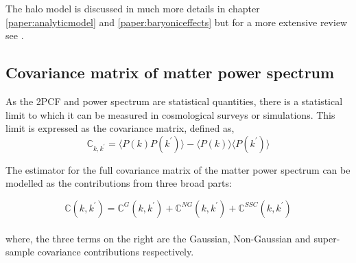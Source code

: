 The halo model is discussed in much more details in chapter \ref{paper:analyticmodel} 
and \ref{paper:baryoniceffects} but for a more extensive review see
\cite{2002PhR...372....1C}.


\subsection{Covariance matrix of matter power spectrum}
As the 2PCF and power spectrum are statistical quantities, there is a statistical limit
to which it can be measured in cosmological surveys or simulations. This limit is expressed
as the covariance matrix, defined as,
\begin{equation}
	\mathbb{C}_{k,k^{\prime}}	= 
			\langle P(k)P(k^{\prime}) \rangle - 
			\langle P(k)\rangle \langle P(k^{\prime})\rangle
\end{equation}

The estimator for the full covariance matrix of the matter power spectrum 
can be modelled as the contributions from three broad parts:

\begin{equation}
	\mathbb{C}(k,k^{\prime}) = \mathbb{C}^{G}(k,k^{\prime}) + 
								\mathbb{C}^{NG}(k,k^{\prime}) + 
								\mathbb{C}^{SSC}(k,k^{\prime})
\end{equation}
\\
where, the three terms on the right are the Gaussian, Non-Gaussian and 
super-sample covariance contributions respectively. 

